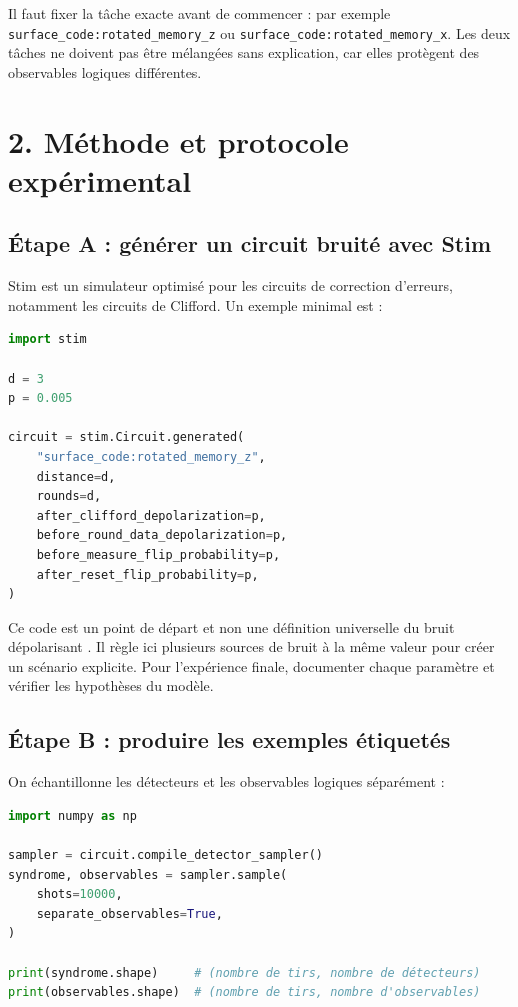 \documentclass[11pt,a4paper]{article}
\begin{document}
Il faut fixer la tâche exacte avant de commencer : par exemple
\texttt{surface\_code:rotated\_memory\_z} ou
\texttt{surface\_code:rotated\_memory\_x}. Les deux tâches ne doivent pas
être mélangées sans explication, car elles protègent des observables logiques
différentes.

\section{2. Méthode et protocole expérimental}

\subsection{Étape A : générer un circuit bruité avec Stim}

Stim est un simulateur optimisé pour les circuits de correction d'erreurs,
notamment les circuits de Clifford. Un exemple minimal est :

\begin{lstlisting}[language=Python,caption={Exemple de circuit de mémoire de code de surface}]
import stim

d = 3
p = 0.005

circuit = stim.Circuit.generated(
    "surface_code:rotated_memory_z",
    distance=d,
    rounds=d,
    after_clifford_depolarization=p,
    before_round_data_depolarization=p,
    before_measure_flip_probability=p,
    after_reset_flip_probability=p,
)
\end{lstlisting}

Ce code est un point de départ et non une définition universelle du
\og bruit dépolarisant \fg{}. Il règle ici plusieurs sources de bruit à la
même valeur pour créer un scénario explicite. Pour l'expérience finale,
documenter chaque paramètre et vérifier les hypothèses du modèle.

\subsection{Étape B : produire les exemples étiquetés}

On échantillonne les détecteurs et les observables logiques séparément :
\begin{lstlisting}[language=Python,caption={Échantillonnage des syndromes et observables}]
import numpy as np

sampler = circuit.compile_detector_sampler()
syndrome, observables = sampler.sample(
    shots=10000,
    separate_observables=True,
)

print(syndrome.shape)     # (nombre de tirs, nombre de détecteurs)
print(observables.shape)  # (nombre de tirs, nombre d'observables)
\end{lstlisting}
\end{document}
